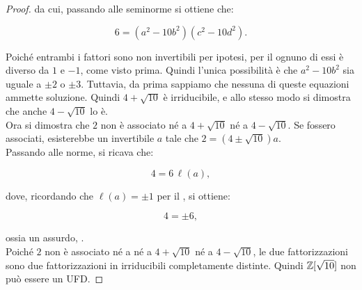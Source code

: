 \begin{proof}
    \vskip 0.1in
    
    da cui, passando alle seminorme si ottiene che:
    
    \[ 6 = (a^2 - 10b^2)(c^2 - 10d^2). \]
    
    \vskip 0.1in
    
    Poiché entrambi i fattori sono non invertibili per ipotesi,
    per il  ognuno di essi è
    diverso da $1$ e $-1$, come visto prima. Quindi l'unica
    possibilità è che $a^2 - 10b^2$ sia uguale a $\pm 2$ o
    $\pm 3$. Tuttavia, da prima sappiamo che nessuna di queste
    equazioni ammette soluzione. Quindi $4+\sqrt{10}$ è irriducibile,
    e allo stesso modo si dimostra che anche $4-\sqrt{10}$ lo
    è. \\
    
    Ora si dimostra che $2$ non è associato né a $4 + \sqrt{10}$
    né a $4 - \sqrt{10}$. Se fossero associati, esisterebbe
    un invertibile $a$ tale che $2 = (4 \pm \sqrt{10})a$. \\
    
    Passando alle norme, si ricava che:
    
    \[ 4 = 6 \, \ell(a),  \]
    
    \vskip 0.1in
    
    dove, ricordando che $\ell(a)=\pm 1$ per il ,
    si ottiene:
    
    \[ 4 = \pm 6, \]
    
    \vskip 0.1in
    
    ossia un assurdo, \Lightning{}. \\
    
    Poiché $2$ non è associato né a né a $4 + \sqrt{10}$
    né a $4 - \sqrt{10}$, le due fattorizzazioni sono due
    fattorizzazioni in irriducibili completamente
    distinte. Quindi $\mathbb{Z}[\sqrt{10}]$ non può essere un UFD.
\end{proof}
